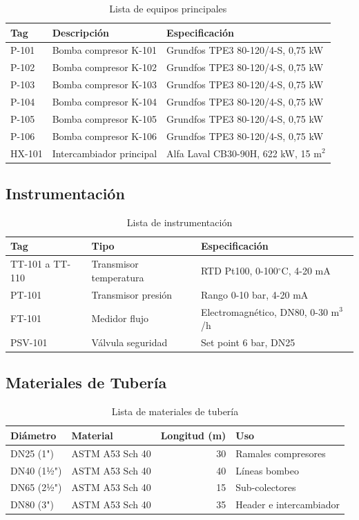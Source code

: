 \documentclass[12pt,a4paper]{article}
\begin{document}
\begin{table}[h]
\centering
\caption{Lista de equipos principales}
\begin{tabular}{lll}
\toprule
\textbf{Tag} & \textbf{Descripción} & \textbf{Especificación} \\
\midrule
P-101 & Bomba compresor K-101 & Grundfos TPE3 80-120/4-S, 0,75 kW \\
P-102 & Bomba compresor K-102 & Grundfos TPE3 80-120/4-S, 0,75 kW \\
P-103 & Bomba compresor K-103 & Grundfos TPE3 80-120/4-S, 0,75 kW \\
P-104 & Bomba compresor K-104 & Grundfos TPE3 80-120/4-S, 0,75 kW \\
P-105 & Bomba compresor K-105 & Grundfos TPE3 80-120/4-S, 0,75 kW \\
P-106 & Bomba compresor K-106 & Grundfos TPE3 80-120/4-S, 0,75 kW \\
HX-101 & Intercambiador principal & Alfa Laval CB30-90H, 622 kW, 15 m$^2$ \\
\bottomrule
\end{tabular}
\end{table}

\subsection{Instrumentación}

\begin{table}[h]
\centering
\caption{Lista de instrumentación}
\begin{tabular}{lll}
\toprule
\textbf{Tag} & \textbf{Tipo} & \textbf{Especificación} \\
\midrule
TT-101 a TT-110 & Transmisor temperatura & RTD Pt100, 0-100$^\circ$C, 4-20 mA \\
PT-101 & Transmisor presión & Rango 0-10 bar, 4-20 mA \\
FT-101 & Medidor flujo & Electromagnético, DN80, 0-30 m$^3$/h \\
PSV-101 & Válvula seguridad & Set point 6 bar, DN25 \\
\bottomrule
\end{tabular}
\end{table}

\subsection{Materiales de Tubería}

\begin{table}[h]
\centering
\caption{Lista de materiales de tubería}
\begin{tabular}{llrl}
\toprule
\textbf{Diámetro} & \textbf{Material} & \textbf{Longitud (m)} & \textbf{Uso} \\
\midrule
DN25 (1") & ASTM A53 Sch 40 & 30 & Ramales compresores \\
DN40 (1½") & ASTM A53 Sch 40 & 40 & Líneas bombeo \\
DN65 (2½") & ASTM A53 Sch 40 & 15 & Sub-colectores \\
DN80 (3") & ASTM A53 Sch 40 & 35 & Header e intercambiador \\
\bottomrule
\end{tabular}
\end{table}
\end{document}

